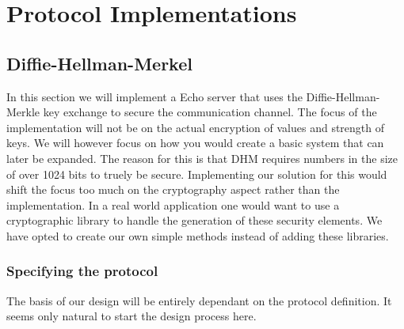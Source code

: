 \section{Protocol Implementations}
\subsection{Diffie-Hellman-Merkel}
In this section we will implement a Echo server that uses the Diffie-Hellman-Merkle key exchange to secure the communication channel. The focus of the implementation will not be on the actual encryption of values and strength of keys. We will however focus on how you would create a basic system that can later be expanded. The reason for this is that DHM requires numbers in the size of over 1024 bits to truely be secure. Implementing our solution for this would shift the focus too much on the cryptography aspect rather than the implementation. In  a real world application one would want to use a cryptographic library to handle the generation of these security elements. We have opted to create our own simple methods instead of adding these libraries.

\subsubsection{Specifying the protocol}
The basis of our design will be entirely dependant on the protocol definition. It seems only natural to start the design process here.

